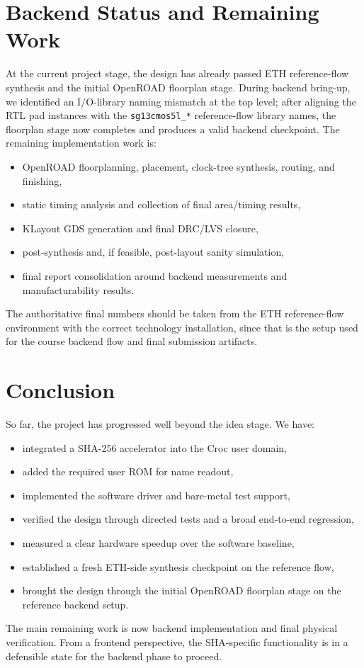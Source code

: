 \documentclass[11pt,a4paper]{article}
\begin{document}
\section{Backend Status and Remaining Work}
At the current project stage, the design has already passed ETH reference-flow
synthesis and the initial OpenROAD floorplan stage. During backend bring-up, we
identified an I/O-library naming mismatch at the top level; after aligning the
RTL pad instances with the \texttt{sg13cmos5l\_*} reference-flow library names,
the floorplan stage now completes and produces a valid backend checkpoint. The
remaining implementation work is:
\begin{itemize}
  \item OpenROAD floorplanning, placement, clock-tree synthesis, routing, and
  finishing,
  \item static timing analysis and collection of final area/timing results,
  \item KLayout GDS generation and final DRC/LVS closure,
  \item post-synthesis and, if feasible, post-layout sanity simulation,
  \item final report consolidation around backend measurements and
  manufacturability results.
\end{itemize}

The authoritative final numbers should be taken from the ETH reference-flow
environment with the correct technology installation, since that is the setup
used for the course backend flow and final submission artifacts.

\section{Conclusion}
So far, the project has progressed well beyond the idea stage. We have:
\begin{itemize}
  \item integrated a SHA-256 accelerator into the Croc user domain,
  \item added the required user ROM for name readout,
  \item implemented the software driver and bare-metal test support,
  \item verified the design through directed tests and a broad end-to-end
  regression,
  \item measured a clear hardware speedup over the software baseline,
  \item established a fresh ETH-side synthesis checkpoint on the reference
  flow,
  \item brought the design through the initial OpenROAD floorplan stage on the
  reference backend setup.
\end{itemize}

The main remaining work is now backend implementation and final physical
verification. From a frontend perspective, the SHA-specific functionality is in
a defensible state for the backend phase to proceed.
\end{document}

